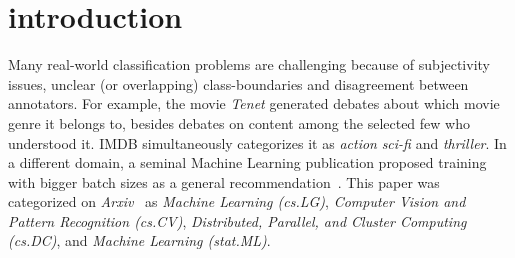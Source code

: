 
\section{introduction}
\label{sec:org662677c}





Many real-world classification problems are challenging because of
subjectivity issues, unclear (or overlapping) class-boundaries and
disagreement between annotators. For example, the movie \textit{Tenet} generated 
debates about which movie genre it belongs to, besides debates on content among the selected few who understood it. IMDB simultaneously categorizes it as \textit{action}
\textit{sci-fi} and \textit{thriller}. In a different domain, a seminal
Machine Learning publication proposed training with bigger batch sizes as a
general recommendation~\cite{bigBS}. This paper was categorized on
\textit{Arxiv}~\cite{bigBSArxiv} as \textit{Machine Learning (cs.LG)},
\textit{Computer Vision and Pattern Recognition (cs.CV)}, \textit{Distributed,
Parallel, and Cluster Computing (cs.DC)}, and \textit{Machine Learning
(stat.ML)}.


